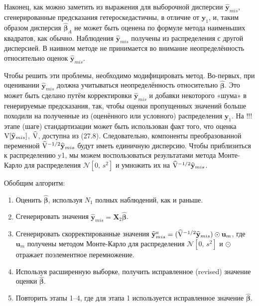 Наконец, как можно заметить из выражения для выборочной дисперсии $\widehat{\mathbf{y}}_{mis}$, сгенерированные предсказания гетероскедастичны, в отличие от $\mathbf{y}_1$, и, таким образом дисперсия $\widehat{\mathbf{\beta}}_A$ не может быть оценена по формуле метода наименьших квадратов, как обычно. Наблюдения $\widehat{\mathbf{y}}_{mis}$ получены из распределения с другой дисперсией. В наивном методе не принимается во внимание неопределённость относительно оценок $\widehat{\mathbf{y}}_{mis}$.

Чтобы решить эти проблемы, необходимо модифицировать метод. Во-первых, при оценивании $\widehat{\mathbf{y}}_{mis}$ должна учитываться неопределённость относительно $\widehat{\mathbf{\beta}}$. Это может быть сделано путём корректировки $\widehat{\mathbf{y}}_{mis}$ и добавки некоторого «шума» в генерируемые предсказания, так, чтобы оценки пропущенных значений больше походили на полученные из (оценённого или условного) распределения $\mathbf{y}_1$. На !!! этапе (шаге) стандартизации может быть использован факт того, что оценка $\mathrm{V}[\widehat{\mathbf{y}}_{mis}]$, $\widehat{\mathbf{\mathrm{V}}}$, доступна из (27.8). Следовательно, компоненты преобразованной переменной $\widehat{\mathbf{\mathrm{V}}}^{-1/2}\widehat{\mathbf{y}}_{mis}$ будут иметь единичную дисперсию. Чтобы приблизиться к распределению y1, мы можем воспользоваться результатами метода Монте-Карло для распределения $\mathcal{N}[0, \, s^2]$ и умножить их на $\widehat{\mathbf{\mathrm{V}}}^{-1/2}\widehat{\mathbf{y}}_{mis}$.

Обобщим алгоритм:
\begin{enumerate}
\item	Оценить $\widehat{\mathbf{\beta}}$, используя $N_1$ полных наблюдений, как и раньше.
\item	Сгенерировать значения $\widehat{\mathbf{y}}_{mis}=\mathbf{X}_2\widehat{\mathbf{\beta}}$.
\item	Сгенерировать скорректированные значения $\widehat{\mathbf{y}}_{mis}^a=(\widehat{\mathbf{\mathrm{V}}}^{-1/2}\widehat{\mathbf{y}}_{mis}) \odot \mathbf{u}_m$, где $\mathbf{u}_m$ получены методом Монте-Карло для распределения $\mathcal{N}[0, \, s^2]$ и $\odot$ отражает поэлементное перемножение.
\item	Используя расширенную выборке, получить исправленное (revised) значение оценки $\widehat{\mathbf{\beta}}$.
\item	Повторить этапы 1--4, где для этапа 1 используется исправленное значение $\widehat{\mathbf{\beta}}$.
\end{enumerate}


